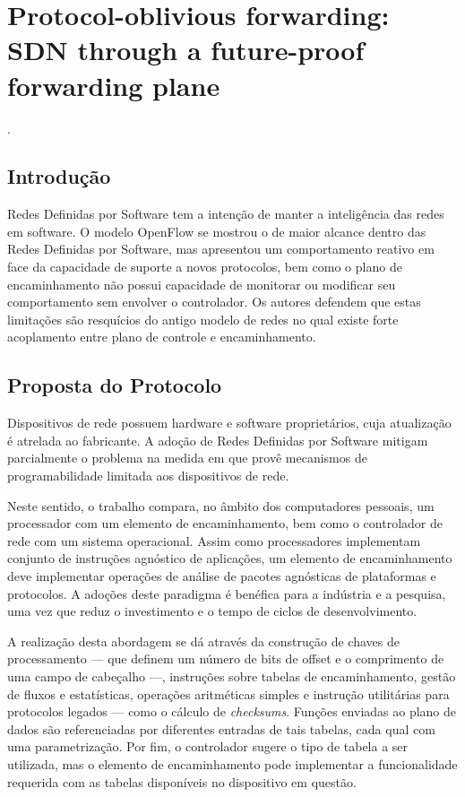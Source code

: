 
\chapter{Protocol-oblivious forwarding: SDN through a future-proof forwarding plane}
 \cite{song2013protocol}.


\section*{Introdução}

Redes Definidas por Software tem a intenção de manter a inteligência das redes em software. O modelo OpenFlow se mostrou o de maior alcance dentro das Redes Definidas por Software, mas apresentou um comportamento reativo em face da capacidade de suporte a novos protocolos, bem como o plano de encaminhamento não possui capacidade de monitorar ou modificar seu comportamento sem envolver o controlador. Os autores defendem que estas limitações são resquícios do antigo modelo de redes no qual existe forte acoplamento entre plano de controle e encaminhamento.


\section*{Proposta do Protocolo}

Dispositivos de rede possuem hardware e software proprietários, cuja atualização é atrelada ao fabricante. A adoção de Redes Definidas por Software mitigam parcialmente o problema na medida em que provê mecanismos de programabilidade limitada aos dispositivos de rede.

Neste sentido, o trabalho compara, no âmbito dos computadores pessoais, um processador com um elemento de encaminhamento, bem como o controlador de rede com um sistema operacional. Assim como processadores implementam conjunto de instruções agnóstico de aplicações, um elemento de encaminhamento deve implementar operações de análise de pacotes agnósticas de plataformas e protocolos. A adoções deste paradigma é benéfica para a indústria e a pesquisa, uma vez que reduz o investimento e o tempo de ciclos de desenvolvimento.

A realização desta abordagem se dá através da construção de chaves de processamento --- que definem um número de bits de offset e o comprimento de uma campo de cabeçalho ---, instruções sobre tabelas de encaminhamento, gestão de fluxos e estatísticas, operações aritméticas simples e instrução utilitárias para protocolos legados --- como o cálculo de \textit{checksums}. Funções enviadas ao plano de dados são referenciadas por diferentes entradas de tais tabelas, cada qual com uma parametrização. Por fim, o controlador sugere o tipo de tabela a ser utilizada, mas o elemento de encaminhamento pode implementar a funcionalidade requerida com as tabelas disponíveis no dispositivo em questão.


